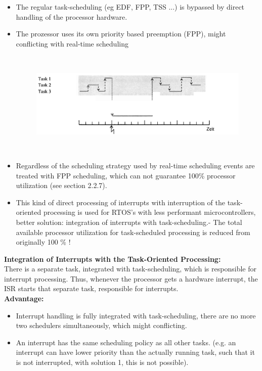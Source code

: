 \begin{itemize}

\item The regular task-scheduling (eg EDF, FPP, TSS ...) is bypassed by direct handling   of the processor hardware.

\item The prozessor uses its own priority based preemption (FPP), might conflicting with real-time scheduling

 	\begin{figure}[h]
    \centering
    \includegraphics[width=14cm, height=5cm]{Images/image22.png}
    \label{fig:Fig }
    \end{figure}

\item Regardless of the scheduling strategy used by real-time scheduling events are treated with FPP scheduling, which can not guarantee 100\% processor utilization   (see section 2.2.7).

\item This kind of direct processing of interrupts with interruption of the task-oriented   processing is used for RTOS's with less performant microcontrollers,   better solution: integration of interrupts with task-scheduling.- The total available processor utilization for task-scheduled processing is reduced from originally 100 \% !
\end{itemize}

{\rot\bf Integration of Interrupts with the Task-Oriented Processing: }\\

There is a separate task, integrated with task-scheduling, which is responsible for interrupt processing. Thus, whenever the processor gets a hardware interrupt, the ISR starts that separate task, responsible for interrupts.\\

\textbf{Advantage: }

\begin{itemize}
	\item Interrupt handling is fully integrated with task-scheduling,   there are no more two schedulers simultaneously, which might conflicting.
	\item An interrupt has the same scheduling policy as all other tasks.   (e.g. an interrupt can have lower priority than the actually running task, such that it   is not interrupted, with solution 1, this is not possible).
\end{itemize}  


